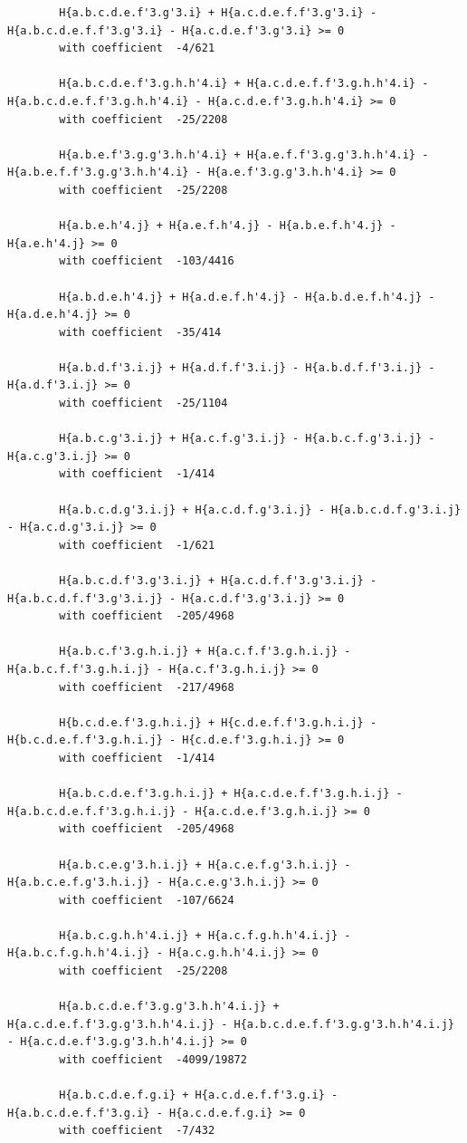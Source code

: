 \documentclass[11pt, a4paper]{kybernetika}
\begin{document}
\begin{verbatim}
		H{a.b.c.d.e.f'3.g'3.i} + H{a.c.d.e.f.f'3.g'3.i} - H{a.b.c.d.e.f.f'3.g'3.i} - H{a.c.d.e.f'3.g'3.i} >= 0
		with coefficient  -4/621
		
		H{a.b.c.d.e.f'3.g.h.h'4.i} + H{a.c.d.e.f.f'3.g.h.h'4.i} - H{a.b.c.d.e.f.f'3.g.h.h'4.i} - H{a.c.d.e.f'3.g.h.h'4.i} >= 0
		with coefficient  -25/2208
		
		H{a.b.e.f'3.g.g'3.h.h'4.i} + H{a.e.f.f'3.g.g'3.h.h'4.i} - H{a.b.e.f.f'3.g.g'3.h.h'4.i} - H{a.e.f'3.g.g'3.h.h'4.i} >= 0
		with coefficient  -25/2208
		
		H{a.b.e.h'4.j} + H{a.e.f.h'4.j} - H{a.b.e.f.h'4.j} - H{a.e.h'4.j} >= 0
		with coefficient  -103/4416
		
		H{a.b.d.e.h'4.j} + H{a.d.e.f.h'4.j} - H{a.b.d.e.f.h'4.j} - H{a.d.e.h'4.j} >= 0
		with coefficient  -35/414
		
		H{a.b.d.f'3.i.j} + H{a.d.f.f'3.i.j} - H{a.b.d.f.f'3.i.j} - H{a.d.f'3.i.j} >= 0
		with coefficient  -25/1104
		
		H{a.b.c.g'3.i.j} + H{a.c.f.g'3.i.j} - H{a.b.c.f.g'3.i.j} - H{a.c.g'3.i.j} >= 0
		with coefficient  -1/414
		
		H{a.b.c.d.g'3.i.j} + H{a.c.d.f.g'3.i.j} - H{a.b.c.d.f.g'3.i.j} - H{a.c.d.g'3.i.j} >= 0
		with coefficient  -1/621
		
		H{a.b.c.d.f'3.g'3.i.j} + H{a.c.d.f.f'3.g'3.i.j} - H{a.b.c.d.f.f'3.g'3.i.j} - H{a.c.d.f'3.g'3.i.j} >= 0
		with coefficient  -205/4968
		
		H{a.b.c.f'3.g.h.i.j} + H{a.c.f.f'3.g.h.i.j} - H{a.b.c.f.f'3.g.h.i.j} - H{a.c.f'3.g.h.i.j} >= 0
		with coefficient  -217/4968
		
		H{b.c.d.e.f'3.g.h.i.j} + H{c.d.e.f.f'3.g.h.i.j} - H{b.c.d.e.f.f'3.g.h.i.j} - H{c.d.e.f'3.g.h.i.j} >= 0
		with coefficient  -1/414
		
		H{a.b.c.d.e.f'3.g.h.i.j} + H{a.c.d.e.f.f'3.g.h.i.j} - H{a.b.c.d.e.f.f'3.g.h.i.j} - H{a.c.d.e.f'3.g.h.i.j} >= 0
		with coefficient  -205/4968
		
		H{a.b.c.e.g'3.h.i.j} + H{a.c.e.f.g'3.h.i.j} - H{a.b.c.e.f.g'3.h.i.j} - H{a.c.e.g'3.h.i.j} >= 0
		with coefficient  -107/6624
		
		H{a.b.c.g.h.h'4.i.j} + H{a.c.f.g.h.h'4.i.j} - H{a.b.c.f.g.h.h'4.i.j} - H{a.c.g.h.h'4.i.j} >= 0
		with coefficient  -25/2208
		
		H{a.b.c.d.e.f'3.g.g'3.h.h'4.i.j} + H{a.c.d.e.f.f'3.g.g'3.h.h'4.i.j} - H{a.b.c.d.e.f.f'3.g.g'3.h.h'4.i.j} - H{a.c.d.e.f'3.g.g'3.h.h'4.i.j} >= 0
		with coefficient  -4099/19872
		
		H{a.b.c.d.e.f.g.i} + H{a.c.d.e.f.f'3.g.i} - H{a.b.c.d.e.f.f'3.g.i} - H{a.c.d.e.f.g.i} >= 0
		with coefficient  -7/432
		

\end{verbatim}
\end{document}
